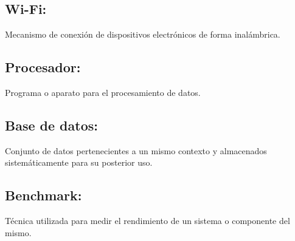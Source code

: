 \documentclass[spanish,a4paper,12pt]{report}	%
\begin{document}
\subsection{Wi-Fi:} Mecanismo de conexión de dispositivos electrónicos de forma inalámbrica.
\subsection{Procesador:} Programa o aparato para el procesamiento de datos.
\subsection{Base de datos:} Conjunto de datos pertenecientes a un mismo contexto y almacenados sistemáticamente para su posterior uso.
\subsection{Benchmark:} Técnica utilizada para medir el rendimiento de un sistema o componente del mismo.


\newpage
\mbox{}
\thispagestyle{empty}						%
\newpage

\end{document}
